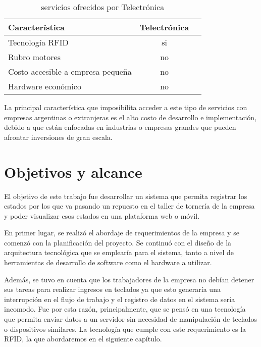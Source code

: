\begin{table}[h]
	\centering
	\caption[caption corto]{servicios ofrecidos por Telectrónica}
	\begin{tabular}{l c c}    
		\toprule
		\textbf{Característica} 	 & \textbf{Telectrónica} 		  \\
		\midrule
		Tecnología RFID	 & si				 \\
		Rubro motores & no \\		
		Costo accesible a empresa pequeña	 & no				 \\
		Hardware económico	 & no				 \\
		\bottomrule
		\hline
	\end{tabular}
	\label{tab:peces}
\end{table}

La principal característica que imposibilita acceder a este tipo de servicios con empresas argentinas o extranjeras es el alto costo de desarrollo e implementación, debido a que están enfocadas en industrias o empresas grandes que pueden afrontar inversiones de gran escala.



\section{Objetivos y alcance}

El objetivo de este trabajo fue desarrollar un sistema que permita registrar los estados por los que va pasando un repuesto en el taller de tornería de la empresa y poder visualizar esos estados en una plataforma web o móvil. 

En primer lugar, se realizó el abordaje de requerimientos de la empresa y se comenzó con la planificación del proyecto. Se continuó con el diseño de la arquitectura tecnológica que se emplearía para el sistema, tanto a nivel de herramientas de desarrollo de software como el hardware a utilizar.

Además, se tuvo en cuenta que los trabajadores de la empresa no debían detener sus tareas para realizar ingresos en teclados ya que esto generaría una interrupción en el flujo de trabajo y el registro de datos en el sistema sería incomodo. Fue por esta razón, principalmente, que se pensó en una tecnología que permita enviar datos a un servidor sin necesidad de manipulación de teclados o dispositivos similares. La tecnología que cumple con este requerimiento es la RFID, la que abordaremos en el siguiente capítulo.

